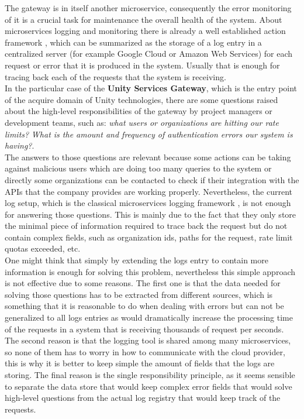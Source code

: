 \documentclass[english, 12pt, a4paper, sci, utf8, a-1b, online]{aaltothesis}
\begin{document}
The gateway is in itself another microservice, consequently the error monitoring of it is a crucial task for maintenance the overall health of the system. About microservices logging and monitoring there is already a well established action framework \cite{MicroservicesBestPractices}, which can be summarized as the storage of a log entry in a centralized server (for example Google Cloud or Amazon Web Services) for each request or error that it is produced in the system. Usually that is enough for tracing back each of the requests that the system is receiving.\\

In the particular case of the \textbf{Unity Services Gateway}, which is the entry point of the acquire domain of Unity technologies, there are some questions raised about the high-level responsibilities of the gateway by project managers or development teams, such as: \textit{what users or organizations are hitting our rate limits?} \textit{What is the amount and frequency of authentication errors our system is having?}.\\

The answers to those questions are relevant because some actions can be taking against malicious users which are doing too many queries to the system or directly some organizations can be contacted to check if their integration with the APIs that the company provides are working properly. Nevertheless, the current log setup, which is the classical microservices logging framework \cite{MicroservicesBestPractices}, is not enough for answering those questions. This is mainly due to the fact that they only store the minimal piece of information required to trace back the request but do not contain complex fields, such as organization ids, paths for the request, rate limit quotas exceeded, etc.\\

One might think that simply by extending the logs entry to contain more information is enough for solving this problem, nevertheless this simple approach is not effective due to some reasons. The first one is that the data needed for solving those questions has to be extracted from different sources, which is something that it is reasonable to do when dealing with errors but can not be generalized to all logs entries as would dramatically increase the processing time of the requests in a system that is receiving thousands of request per seconds. The second reason is that the logging tool is shared among many microservices, so none of them has to worry in how to communicate with the cloud provider, this is why it is better to keep simple the amount of fields that the logs are storing. The final reason is the single responsibility principle, as it seems sensible to separate the data store that would keep complex error fields that would solve high-level questions from the actual log registry that would keep track of the requests.\\
\end{document}
